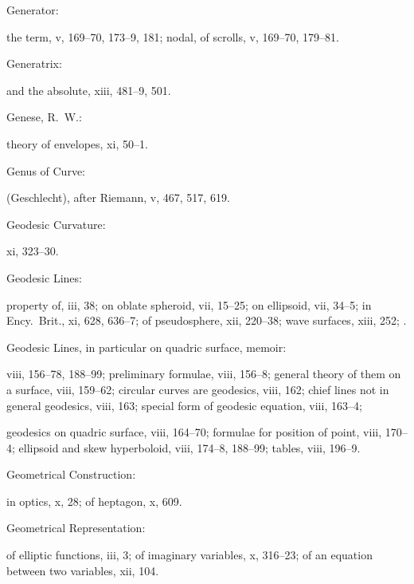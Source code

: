 \documentclass[11pt,a4paper]{book}
\providecommand{\V}[1]{#1}
\providecommand{\IndexEntry}[2]{#1\dotfill #2\par}
\begin{document}
\IndexEntry{Generator}: the term, \V{v}, 169--70, 173--9, 181; nodal, of scrolls, \V{v}, 169--70, 179--81.

\IndexEntry{Generatrix}: and the absolute, \V{xiii}, 481--9, 501.

\IndexEntry{Genese, R.\ W.}: theory of envelopes, \V{xi}, 50--1.

\IndexEntry{Genus of Curve}: (Geschlecht), after Riemann, \V{v}, 467, 517, 619.

\IndexEntry{Geodesic Curvature}: \V{xi}, 323--30.

\IndexEntry{Geodesic Lines}: property of, \V{iii}, 38; on oblate spheroid, \V{vii}, 15--25; on ellipsoid, \V{vii}, 34--5; in Ency.\ Brit., \V{xi}, 628, 636--7; of pseudosphere, \V{xii}, 220--38; wave surfaces, \V{xiii}, 252; .

\IndexEntry{Geodesic Lines, in particular on quadric surface, memoir}: \V{viii}, 156--78, 188--99; preliminary formulae, \V{viii}, 156--8; general theory of them on a surface, \V{viii}, 159--62; circular curves are geodesics, \V{viii}, 162; chief lines not in general geodesics, \V{viii}, 163; special form of geodesic equation, \V{viii}, 163--4;

\newpage

\setcounter{page}{100}

\noindent geodesics on quadric surface, \V{viii}, 164--70; formulae for position of point, \V{viii}, 170--4; ellipsoid and skew hyperboloid, \V{viii}, 174--8, 188--99; tables, \V{viii}, 196--9.

\IndexEntry{Geometrical Construction}: in optics, \V{x}, 28; of heptagon, \V{x}, 609.

\IndexEntry{Geometrical Representation}: of elliptic functions, \V{iii}, 3; of imaginary variables, \V{x}, 316--23; of an equation between two variables, \V{xii}, 104.
\end{document}
